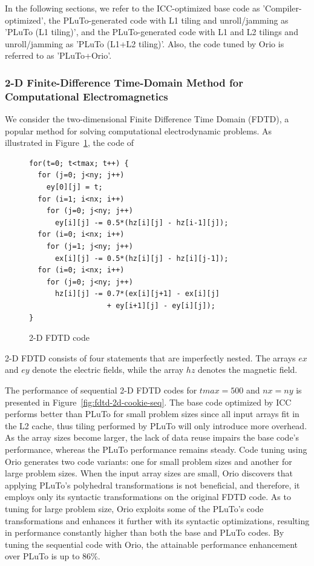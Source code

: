 In the following sections, we refer to the ICC-optimized base code as
'Compiler-optimized', the PLuTo-generated code with L1 tiling and
unroll/jamming as 'PLuTo (L1 tiling)', and the PLuTo-generated code
with L1 and L2 tilings and unroll/jamming as 'PLuTo (L1+L2
tiling)'. Also, the code tuned by Orio is referred to as 'PLuTo+Orio'.
 
\subsubsection{2-D Finite-Difference Time-Domain Method for Computational Electromagnetics}  
We consider the two-dimensional Finite Difference Time Domain (FDTD),
a popular method for solving computational electrodynamic problems. As
illustrated in Figure~\ref{fig:fdtd-2d-code}, the code of 
%
\begin{figure}
\vspace{-0.2in}
\begin{center}
\begin{minipage}{3in} 
\scriptsize
\begin{verbatim} 
for(t=0; t<tmax; t++) { 
  for (j=0; j<ny; j++) 
    ey[0][j] = t; 
  for (i=1; i<nx; i++) 
    for (j=0; j<ny; j++) 
      ey[i][j] -= 0.5*(hz[i][j] - hz[i-1][j]); 
  for (i=0; i<nx; i++) 
    for (j=1; j<ny; j++) 
      ex[i][j] -= 0.5*(hz[i][j] - hz[i][j-1]); 
  for (i=0; i<nx; i++) 
    for (j=0; j<ny; j++) 
      hz[i][j] -= 0.7*(ex[i][j+1] - ex[i][j]
                  + ey[i+1][j] - ey[i][j]); 
} 
\end{verbatim} 
\end{minipage} 
\end{center}
\vspace{-0.2in}
\caption{2-D FDTD code} 
\label{fig:fdtd-2d-code} 
\end{figure}
%
2-D FDTD consists of four statements that are imperfectly nested. The arrays
$ex$ and $ey$ denote the electric fields, while the array $hz$ denotes
the magnetic field.

The performance of sequential 2-D FDTD codes for $tmax=500$ and
$nx=ny$ is presented in Figure~\ref{fig:fdtd-2d-cookie-seq}. The base
code optimized by ICC performs better than PLuTo for small problem
sizes since all input arrays fit in the L2 cache, thus tiling
performed by PLuTo will only introduce more overhead. As the array
sizes become larger, the lack of data reuse impairs the base code's
performance, whereas the PLuTo performance remains steady. Code tuning
using Orio generates two code variants: one for small problem sizes
and another for large problem sizes. When the input array sizes are
small, Orio discovers that applying PLuTo's polyhedral transformations
is not beneficial, and therefore, it employs only its syntactic
transformations on the original FDTD code. As to tuning for large
problem size, Orio exploits some of the PLuTo's code transformations
and enhances it further with its syntactic optimizations, resulting in
performance constantly higher than both the base and PLuTo codes. By
tuning the sequential code with Orio, the attainable performance
enhancement over PLuTo is up to 86\%.
 
